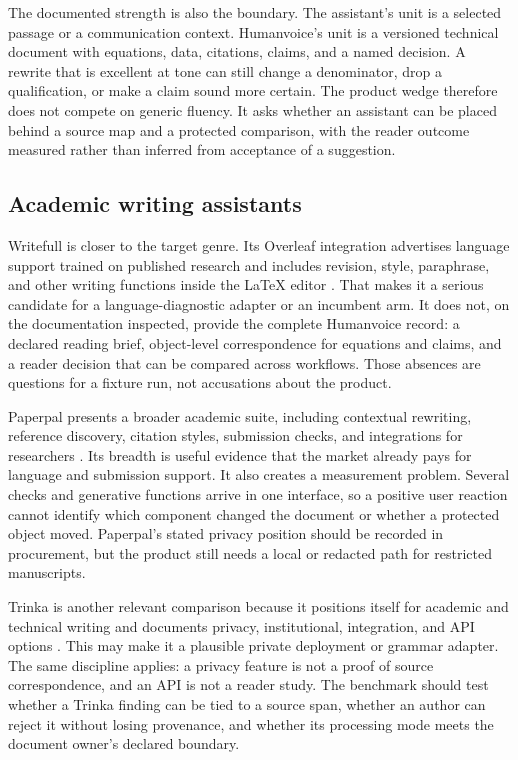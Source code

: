 The documented strength is also the boundary. The assistant's unit is a
selected passage or a communication context. Humanvoice's unit is a versioned
technical document with equations, data, citations, claims, and a named
decision. A rewrite that is excellent at tone can still change a denominator,
drop a qualification, or make a claim sound more certain. The product wedge
therefore does not compete on generic fluency. It asks whether an assistant
can be placed behind a source map and a protected comparison, with the reader
outcome measured rather than inferred from acceptance of a suggestion.

\subsection{Academic writing assistants}

Writefull is closer to the target genre. Its Overleaf integration advertises
language support trained on published research and includes revision, style,
paraphrase, and other writing functions inside the LaTeX editor
\citep{writefull2026overleaf}. That makes it a serious candidate for a
language-diagnostic adapter or an incumbent arm. It does not, on the
documentation inspected, provide the complete Humanvoice record: a declared
reading brief, object-level correspondence for equations and claims, and a
reader decision that can be compared across workflows. Those absences are
questions for a fixture run, not accusations about the product.

Paperpal presents a broader academic suite, including contextual rewriting,
reference discovery, citation styles, submission checks, and integrations for
researchers \citep{paperpal2026assistant}. Its breadth is useful evidence that
the market already pays for language and submission support. It also creates a
measurement problem. Several checks and generative functions arrive in one
interface, so a positive user reaction cannot identify which component changed
the document or whether a protected object moved. Paperpal's stated privacy
position should be recorded in procurement, but the product still needs a
local or redacted path for restricted manuscripts.

Trinka is another relevant comparison because it positions itself for academic
and technical writing and documents privacy, institutional, integration, and
API options \citep{trinka2026privacy}. This may make it a plausible private
deployment or grammar adapter. The same discipline applies: a privacy feature
is not a proof of source correspondence, and an API is not a reader study.
The benchmark should test whether a Trinka finding can be tied to a source span,
whether an author can reject it without losing provenance, and whether its
processing mode meets the document owner's declared boundary.

